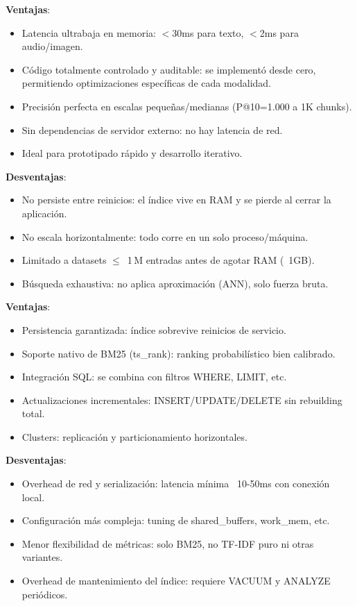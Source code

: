 \documentclass[12pt,a4paper]{article}
\begin{document}
\begin{description}[leftmargin=2cm, style=nextline]
  \item[Índice Invertido / VisualSearch / AudioSearch (propio)]
    \textbf{Ventajas}:
    \begin{itemize}[leftmargin=1cm]
      \item Latencia ultrabaja en memoria: $<$30ms para texto, $<$2ms para audio/imagen.
      \item Código totalmente controlado y auditable: se implementó desde cero,
            permitiendo optimizaciones específicas de cada modalidad.
      \item Precisión perfecta en escalas pequeñas/medianas (P@10=1.000 a 1K chunks).
      \item Sin dependencias de servidor externo: no hay latencia de red.
      \item Ideal para prototipado rápido y desarrollo iterativo.
    \end{itemize}
    \textbf{Desventajas}:
    \begin{itemize}[leftmargin=1cm]
      \item No persiste entre reinicios: el índice vive en RAM y se pierde al cerrar la aplicación.
      \item No escala horizontalmente: todo corre en un solo proceso/máquina.
      \item Limitado a datasets $\leq$~1\,M entradas antes de agotar RAM (~1GB).
      \item Búsqueda exhaustiva: no aplica aproximación (ANN), solo fuerza bruta.
    \end{itemize}

  \item[PostgreSQL GIN (texto)]
    \textbf{Ventajas}:
    \begin{itemize}[leftmargin=1cm]
      \item Persistencia garantizada: índice sobrevive reinicios de servicio.
      \item Soporte nativo de BM25 (ts\_rank): ranking probabilístico bien calibrado.
      \item Integración SQL: se combina con filtros WHERE, LIMIT, etc.
      \item Actualizaciones incrementales: INSERT/UPDATE/DELETE sin rebuilding total.
      \item Clusters: replicación y particionamiento horizontales.
    \end{itemize}
    \textbf{Desventajas}:
    \begin{itemize}[leftmargin=1cm]
      \item Overhead de red y serialización: latencia mínima ~10-50ms con conexión local.
      \item Configuración más compleja: tuning de shared\_buffers, work\_mem, etc.
      \item Menor flexibilidad de métricas: solo BM25, no TF-IDF puro ni otras variantes.
      \item Overhead de mantenimiento del índice: requiere VACUUM y ANALYZE periódicos.
    \end{itemize}


\end{description}
\end{document}
